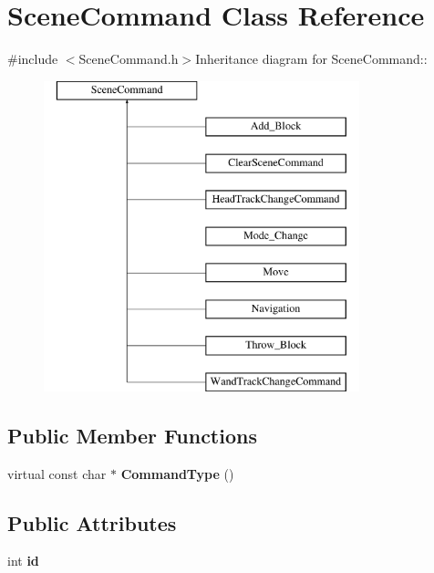 \hypertarget{class_scene_command}{
\section{SceneCommand Class Reference}
\label{class_scene_command}
}


{\ttfamily \#include $<$SceneCommand.h$>$}Inheritance diagram for SceneCommand::\begin{figure}[H]
\begin{center}
\leavevmode
\includegraphics[height=9cm]{class_scene_command}
\end{center}
\end{figure}
\subsection*{Public Member Functions}
\begin{DoxyCompactItemize}
\item 
\hypertarget{class_scene_command_ac51a535d9f1e14d38e07eabe4d5d8ee6}{
virtual const char $\ast$ {\bfseries CommandType} ()}
\label{class_scene_command_ac51a535d9f1e14d38e07eabe4d5d8ee6}

\end{DoxyCompactItemize}
\subsection*{Public Attributes}
\begin{DoxyCompactItemize}
\item 
\hypertarget{class_scene_command_a1e586ef4a2d6d649a305de653619a052}{
int {\bfseries id}}
\label{class_scene_command_a1e586ef4a2d6d649a305de653619a052}

\end{DoxyCompactItemize}


